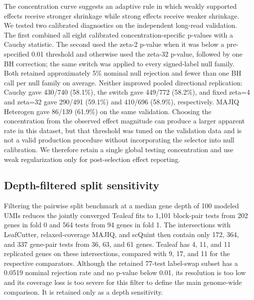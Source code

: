 \documentclass[11pt]{article}
\begin{document}
The concentration curve suggests an adaptive rule in which weakly supported effects receive stronger shrinkage while strong effects receive weaker shrinkage. We tested two calibrated diagnostics on the independent long-read validation. The first combined all eight calibrated concentration-specific p-values with a Cauchy statistic. The second used the zeta-2 p-value when it was below a pre-specified 0.01 threshold and otherwise used the zeta-32 p-value, followed by one BH correction; the same switch was applied to every signed-label null family. Both retained approximately 5\% nominal null rejection and fewer than one BH call per null family on average. Neither improved pooled directional replication: Cauchy gave 430/740 (58.1\%), the switch gave 449/772 (58.2\%), and fixed zeta=4 and zeta=32 gave 290/491 (59.1\%) and 410/696 (58.9\%), respectively. MAJIQ Heterogen gave 86/139 (61.9\%) on the same validation. Choosing the concentration from the observed effect magnitude can produce a larger apparent rate in this dataset, but that threshold was tuned on the validation data and is not a valid production procedure without incorporating the selector into null calibration. We therefore retain a single global testing concentration and use weak regularization only for post-selection effect reporting.

\subsection*{Depth-filtered split sensitivity}

Filtering the pairwise split benchmark at a median gene depth of 100 modeled UMIs reduces the jointly converged Tealeaf fits to 1,101 block-pair tests from 202 genes in fold 0 and 564 tests from 94 genes in fold 1. The intersections with LeafCutter, relaxed-coverage MAJIQ, and scQuint then contain only 172, 364, and 337 gene-pair tests from 36, 63, and 61 genes. Tealeaf has 4, 11, and 11 replicated genes on these intersections, compared with 9, 17, and 11 for the respective comparators. Although the retained 77-test label-swap subset has a 0.0519 nominal rejection rate and no p-value below 0.01, its resolution is too low and its coverage loss is too severe for this filter to define the main genome-wide comparison. It is retained only as a depth sensitivity.
\end{document}
